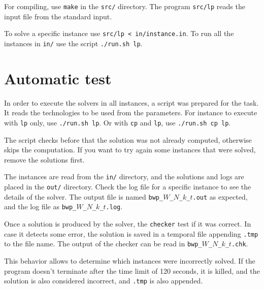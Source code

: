\documentclass[a4paper]{article}
\begin{document}
For compiling, use \texttt{make} in the \texttt{src/} directory. The program 
\texttt{src/lp} reads the input file from the standard input.

To solve a specific instance use \texttt{src/lp < in/instance.in}. To run all 
the instances in \texttt{in/} use the script \texttt{./run.sh lp}.

\section{Automatic test}

In order to execute the solvers in all instances, a script was prepared for the 
task. It reads the technologies to be used from the parameters. For instance to 
execute with \texttt{lp} only, use \texttt{./run.sh lp}. Or with \texttt{cp} and 
\texttt{lp}, use \texttt{./run.sh cp lp}.

The script checks before that the solution was not already computed, otherwise 
skips the computation. If you want to try again some instances that were solved, 
remove the solutions first.

The instances are read from the \texttt{in/} directory, and the solutions and 
logs are placed in the \texttt{out/} directory. Check the log file for a 
specific instance to see the details of the solver. The output file is named 
\texttt{bwp\_$W$\_$N$\_$k$\_$t$.out} as expected, and the log file as 
\texttt{bwp\_$W$\_$N$\_$k$\_$t$.log}.

Once a solution is produced by the solver, the \texttt{checker} test if it was 
correct. In case it detects some error, the solution is saved in a temporal file 
appending \texttt{.tmp} to the file name. The output of the checker can be read 
in \texttt{bwp\_$W$\_$N$\_$k$\_$t$.chk}.

This behavior allows to determine which instances were incorrectly solved. If 
the program doesn't terminate after the time limit of 120 seconds, it is killed, 
and the solution is also considered incorrect, and \texttt{.tmp} is also 
appended.
\end{document}
